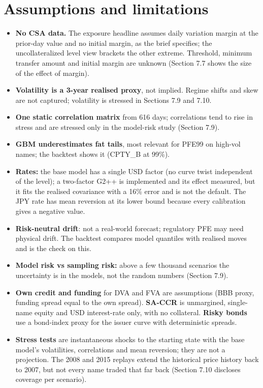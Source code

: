 \documentclass[11pt,letterpaper]{article}
\begin{document}
\section{Assumptions and limitations}
\begin{itemize}
\item \textbf{No CSA data.} The exposure headline assumes daily variation margin at the prior-day value and no initial margin, as the brief specifies; the uncollateralized level view brackets the other extreme. Threshold, minimum transfer amount and initial margin are unknown (Section 7.7 shows the size of the effect of margin).
\item \textbf{Volatility is a 3-year realised proxy}, not implied. Regime shifts and skew are not captured; volatility is stressed in Sections 7.9 and 7.10.
\item \textbf{One static correlation matrix} from 616 days; correlations tend to rise in stress and are stressed only in the model-risk study (Section 7.9).
\item \textbf{GBM underestimates fat tails}, most relevant for PFE99 on high-vol names; the backtest shows it (CPTY\_B at 99\%).
\item \textbf{Rates:} the base model has a single USD factor (no curve twist independent of the level); a two-factor G2++ is implemented and its effect measured, but it fits the realised covariance with a 16\% error and is not the default. The JPY rate has mean reversion at its lower bound because every calibration gives a negative value.
\item \textbf{Risk-neutral drift}: not a real-world forecast; regulatory PFE may need physical drift. The backtest compares model quantiles with realised moves and is the check on this.
\item \textbf{Model risk vs sampling risk:} above a few thousand scenarios the uncertainty is in the models, not the random numbers (Section 7.9).
\item \textbf{Own credit and funding} for DVA and FVA are assumptions (BBB proxy, funding spread equal to the own spread). \textbf{SA-CCR} is unmargined, single-name equity and USD interest-rate only, with no collateral. \textbf{Risky bonds} use a bond-index proxy for the issuer curve with deterministic spreads.
\item \textbf{Stress tests} are instantaneous shocks to the starting state with the base model's volatilities, correlations and mean reversion; they are not a projection. The 2008 and 2015 replays extend the historical price history back to 2007, but not every name traded that far back (Section 7.10 discloses coverage per scenario).

\end{itemize}
\end{document}
